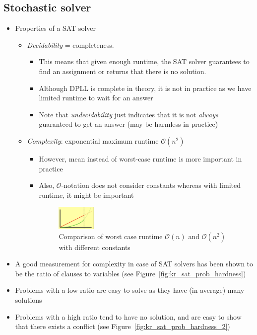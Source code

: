 \subsection{Stochastic solver}
\begin{itemize}
	\item Properties of a SAT solver
	\begin{itemize}
		\item \textit{Decidability} = completeness. 
		\begin{itemize}
			\item This means that given enough runtime, the SAT solver guarantees to find an assignment or returns that there is no solution.
			\item Although DPLL is complete in theory, it is not in practice as we have limited runtime to wait for an answer
			\item Note that \textit{undecidability} just indicates that it is not \textit{always} guaranteed to get an answer (may be harmless in practice)
		\end{itemize}
		\item \textit{Complexity}: exponential maximum runtime $\mathcal{O}(n^2)$
		\begin{itemize}
			\item However, mean instead of worst-case runtime is more important in practice
			\item Also, $\mathcal{O}$-notation does not consider constants whereas with limited runtime, it might be important
			\begin{figure}[ht!]
				\centering
				\includegraphics[width=0.2\textwidth]{figures/kr_sat_prob_worst_case.png}
				\caption{Comparison of worst case runtime $\mathcal{O}(n)$ and $\mathcal{O}(n^2)$ with different constants}
				\label{fig:kr_sat_prob_worst_case}
			\end{figure}
		\end{itemize}
	\end{itemize}
	\item A good measurement for complexity in case of SAT solvers has been shown to be the ratio of clauses to variables (see Figure~\ref{fig:kr_sat_prob_hardness})
	\item Problems with a low ratio are easy to solve as they have (in average) many solutions
	\item Problems with a high ratio tend to have no solution, and are easy to show that there exists a conflict (see Figure~\ref{fig:kr_sat_prob_hardness_2})

\end{itemize}
